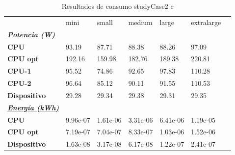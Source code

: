 \begin{table}[H]
    \centering
    \begin{tabular}{lllllll}
    \rowcolor[HTML]{DAE8FC} \ & mini & small & medium & 	large & 	extralarge \\
    \cellcolor[HTML]{DAE8FC} \textbf{\textbf{{\emph{{\underline{{Potencia (W)}}}}}}} &  &  &  & 	 & 	 \\
    \rowcolor[HTML]{EFEFEF} \cellcolor[HTML]{DAE8FC} \textbf{CPU} & 93.19 & 87.71 & 88.38 & 	88.26 & 	97.09 \\
    \cellcolor[HTML]{DAE8FC} \textbf{CPU opt} & 192.16 & 159.98 & 182.76 & 	189.38 & 	220.81 \\
    \rowcolor[HTML]{EFEFEF} \cellcolor[HTML]{DAE8FC} \textbf{\quad CPU-1} & 95.52 & 74.86 & 92.65 & 	97.83 & 	110.28 \\
    \cellcolor[HTML]{DAE8FC} \textbf{\quad CPU-2} & 96.64 & 85.12 & 90.11 & 	91.55 & 	110.53 \\
    \rowcolor[HTML]{EFEFEF} \cellcolor[HTML]{DAE8FC} \textbf{Dispositivo} & 29.28 & 29.34 & 29.38 & 	29.31 & 	29.35 \\
    \cellcolor[HTML]{DAE8FC} \textbf{\textbf{{\emph{{\underline{{Energía (kWh)}}}}}}} &  &  &  & 	 & 	 \\
    \rowcolor[HTML]{EFEFEF} \cellcolor[HTML]{DAE8FC} \textbf{CPU} & 9.96e-07 & 1.61e-06 & 3.31e-06 & 	6.41e-06 & 	1.19e-05 \\
    \cellcolor[HTML]{DAE8FC} \textbf{CPU opt} & 7.19e-07 & 7.04e-07 & 8.33e-07 & 	1.03e-06 & 	1.52e-06 \\
    \rowcolor[HTML]{EFEFEF} \cellcolor[HTML]{DAE8FC} \textbf{Dispositivo} & 1.63e-08 & 3.17e-08 & 6.17e-08 & 	1.22e-07 & 	2.41e-07 \\
    \end{tabular}
    \caption[Resultados de consumo studyCase2 c]{{Resultados de consumo studyCase2 c}}
    \label{table_test_studyCase2_c_hw_powerResults}
\end{table}
